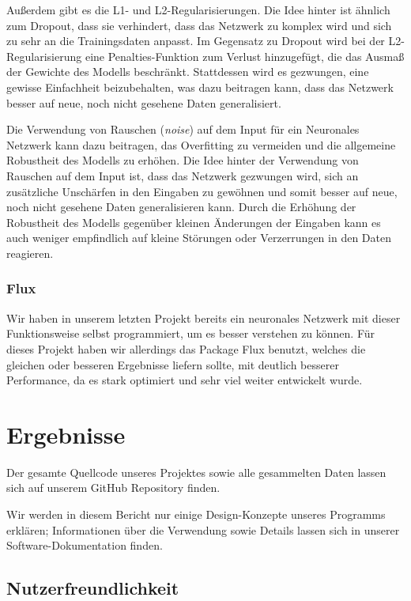 \documentclass[10pt]{article}
\newcommand{\eng}[1]{\textit{#1}}
\newcommand{\feng}[1]{{#1}}
\begin{document}
Außerdem gibt es die L1- und L2-Regularisierungen.  
Die Idee hinter ist ähnlich zum Dropout, dass sie verhindert, dass das Netzwerk zu komplex wird und sich zu sehr an die Trainingsdaten anpasst.
Im Gegensatz zu \feng{Dropout} wird bei der L2-Regularisierung eine Penalties-Funktion zum Verlust hinzugefügt, die das Ausmaß der Gewichte des Modells beschränkt. Stattdessen wird es gezwungen, eine gewisse Einfachheit beizubehalten, was dazu beitragen kann, dass das Netzwerk besser auf neue, noch nicht gesehene Daten generalisiert.

Die Verwendung von Rauschen (\eng{noise}) auf dem Input für ein Neuronales Netzwerk kann dazu beitragen, das Overfitting zu vermeiden und die allgemeine Robustheit des Modells zu erhöhen.
Die Idee hinter der Verwendung von Rauschen auf dem Input ist, dass das Netzwerk gezwungen wird, sich an zusätzliche Unschärfen in den Eingaben zu gewöhnen und somit besser auf neue, noch nicht gesehene Daten generalisieren kann. Durch die Erhöhung der Robustheit des Modells gegenüber kleinen Änderungen der Eingaben kann es auch weniger empfindlich auf kleine Störungen oder Verzerrungen in den Daten reagieren.

\subsubsection{Flux}

Wir haben in unserem letzten Projekt bereits ein neuronales Netzwerk mit dieser Funktionsweise selbst programmiert, um es besser verstehen zu können. Für dieses Projekt haben wir allerdings das Package Flux benutzt, welches die gleichen oder besseren Ergebnisse liefern sollte, mit deutlich besserer Performance, da es stark optimiert und sehr viel weiter entwickelt wurde.

\section{Ergebnisse}

Der gesamte Quellcode unseres Projektes sowie alle gesammelten Daten lassen sich auf unserem GitHub Repository \cite{InterpretingEEG} finden.

Wir werden in diesem Bericht nur einige Design-Konzepte unseres Programms erklären; Informationen über die Verwendung sowie Details lassen sich in unserer Software-Dokumentation \cite{BCIInterfaceDocs} finden. 

\subsection{Nutzerfreundlichkeit}
\end{document}
